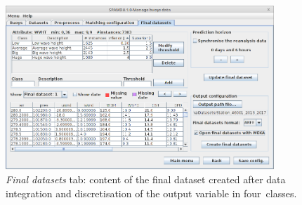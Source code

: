\documentclass[energies,article,accept,moreauthors,pdftex]{Definitions/mdpi}
\begin{document}
\nointerlineskip
\begin{figure}[H]
				\centering
				\includegraphics[width=0.90\textwidth]{figures/FigureFinal_datasets.png}
				\caption{\textit{Final datasets} tab: content of the final dataset created after data integration and discretisation of the output variable in four~classes.}\label{fig:final_dataset}
			\end{figure}
\end{document}
